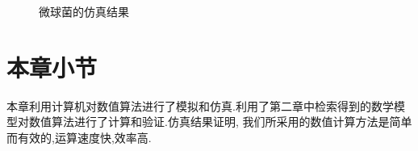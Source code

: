 \begin{figure}[h]
\centering
{}\hspace{10pt}
\hspace{10pt}
\hspace{10pt}
\caption{微球菌的仿真结果}\label{pic:simu_6}
\end{figure}
\section{本章小节}
本章利用计算机对数值算法进行了模拟和仿真.利用了第二章中检索得到的数学模型对数值算法进行了计算和验证.仿真结果证明,
我们所采用的数值计算方法是简单而有效的,运算速度快,效率高.